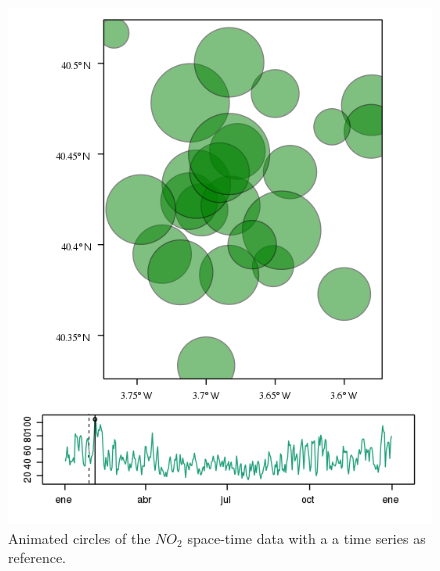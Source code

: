 \documentclass[smallroyalvopaper]{memoir}
\begin{document}
\begin{figure}
  \centering
  \includegraphics[width=\textwidth]{figs/vLine.png}
  \caption{Animated circles of the $NO_2$ space-time data with a a time series as reference.}
  \label{fig:vLine}
\end{figure}

\backmatter

\printbibliography

\clearpage

\printindex
\end{document}
